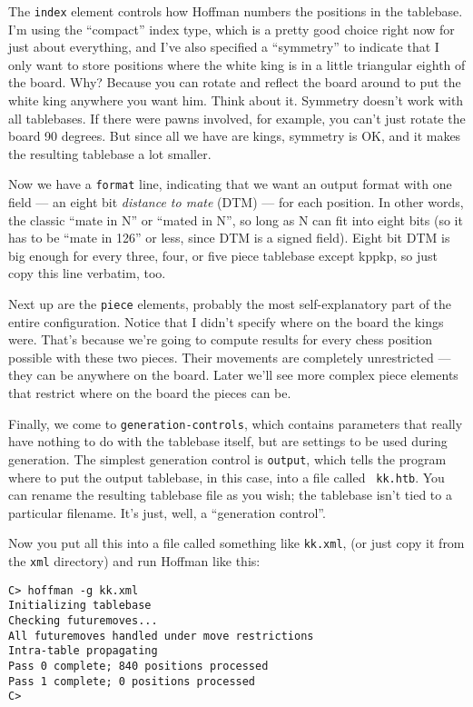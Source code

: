 \documentclass[11pt]{article}
\begin{document}
The {\tt index} element controls how Hoffman numbers the positions in
the tablebase.  I'm using the ``compact'' index type, which is a
pretty good choice right now for just about everything, and I've also
specified a ``symmetry'' to indicate that I only want to store
positions where the white king is in a little triangular eighth of the
board.  Why?  Because you can rotate and reflect the board around to
put the white king anywhere you want him.  Think about it.  Symmetry
doesn't work with all tablebases.  If there were pawns involved, for
example, you can't just rotate the board 90 degrees.  But since all we
have are kings, symmetry is OK, and it makes the resulting tablebase a
lot smaller.

Now we have a {\tt format} line, indicating that we want an output
format with one field --- an eight bit {\it distance to mate} (DTM)
--- for each position.  In other words, the classic ``mate in N'' or
``mated in N'', so long as N can fit into eight bits (so it has to be
``mate in 126'' or less, since DTM is a signed field).  Eight bit DTM
is big enough for every three, four, or five piece tablebase except
kppkp, so just copy this line verbatim, too.

Next up are the {\tt piece} elements, probably the most
self-explanatory part of the entire configuration.  Notice that I
didn't specify where on the board the kings were.  That's because
we're going to compute results for every chess position possible with
these two pieces.  Their movements are completely unrestricted ---
they can be anywhere on the board.  Later we'll see more complex piece
elements that restrict where on the board the pieces can be.

Finally, we come to {\tt generation-controls}, which contains
parameters that really have nothing to do with the tablebase itself,
but are settings to be used during generation.  The simplest
generation control is {\tt output}, which tells the program where to
put the output tablebase, in this case, into a file called {\tt
kk.htb}.  You can rename the resulting tablebase file as you wish; the
tablebase isn't tied to a particular filename.  It's just, well, a
``generation control''.

Now you put all this into a file called something like {\tt kk.xml},
(or just copy it from the {\tt xml} directory) and run Hoffman
like this:


\begin{verbatim}
C> hoffman -g kk.xml
Initializing tablebase
Checking futuremoves...
All futuremoves handled under move restrictions
Intra-table propagating
Pass 0 complete; 840 positions processed
Pass 1 complete; 0 positions processed
C>
\end{verbatim}
\end{document}
